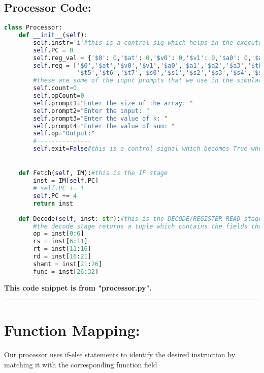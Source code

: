 \documentclass[a4paper,10pt]{article} %
\begin{document}
\subsection*{\Large{\textbf{Processor Code:}}}
\begin{codebox} 
\begin{lstlisting}[language=python]
class Processor:
    def __init__(self):
        self.instr='i'#this is a control sig which helps in the execute phase for different format instructions(i,r,j)
        self.PC = 0
        self.reg_val = {'$0': 0,'$at': 0,'$v0': 0,'$v1': 0,'$a0': 0,'$a1': 0,'$a2': 0,'$a3': 0,'$t0': 0,'$t1': 0,'$t2': 0,'$t3': 0,'$t4': 0,'$t5': 0,'$t6': 0,'$t7': 0,'$s0': 0,'$s1': 0,'$s2': 0,'$s3': 0,'$s4': 0,'$s5': 0,'$s6': 0,'$s7': 0,'$t8': 0,'$t9': 0}
        self.reg = ['$0','$at','$v0','$v1','$a0','$a1','$a2','$a3','$t0','$t1','$t2','$t3','$t4',
                    '$t5','$t6','$t7','$s0','$s1','$s2','$s3','$s4','$s5','$s6','$s7','$t8','$t9']
        #these are some of the input prompts that we use in the simulation
        self.count=0
        self.opCount=0
        self.prompt1="Enter the size of the array: "
        self.prompt2="Enter the input: "
        self.prompt3="Enter the value of k: "
        self.prompt4="Enter the value of sum: "
        self.op="Output:"
        #---------------
        self.exit=False#this is a control signal which becomes True when the final exit syscall is encountered


    def Fetch(self, IM):#this is the IF stage
        inst = IM[self.PC]
        # self.PC += 1
        self.PC += 4
        return inst
    
    def Decode(self, inst: str):#this is the DECODE/REGISTER READ stage
        #the decode stage returns a tuple which contains the fields that are needed by different instructions in their execute phase
        op = inst[0:6]
        rs = inst[6:11]
        rt = inst[11:16]
        rd = inst[16:21]
        shamt = inst[21:26]
        func = inst[26:32]


\end{lstlisting} 
\end{codebox}
\large{\textbf{This code snippet is from "processor.py".}}
\newpage

\rule{\textwidth}{0.5pt}
\section*{\huge{\textbf{Function Mapping:}}}
Our processor uses if-else statements to identify the desired instruction by matching it with the corresponding function field
\end{document}
